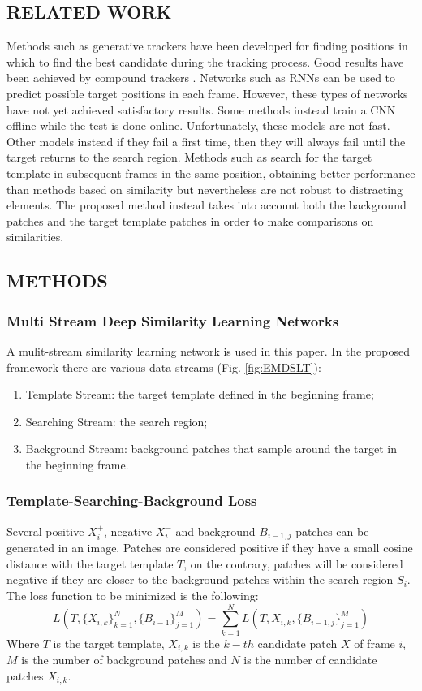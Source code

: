 \subsection{RELATED WORK}
Methods such as generative trackers have been developed for finding positions 
in which to find the best candidate during the tracking process. Good 
results have been achieved by compound trackers \cite{0893551105} \cite{0893551118}. Networks such as 
RNNs \cite{0893551121} can be used to predict possible target positions in each frame. 
However, these types of networks have not yet achieved satisfactory results. 
Some methods instead train a CNN offline while the test is done online. Unfortunately, 
these models are not fast. Other models instead if they fail a first 
time, then they will always fail until the target returns to the search region. 
Methods such as \cite{0893551129} \cite{0893551134} search for the target template in subsequent frames 
in the same position, obtaining better performance than methods based on 
similarity but nevertheless are not robust to distracting elements. The proposed 
method instead takes into account both the background patches and 
the target template patches in order to make comparisons on similarities.

\subsection{METHODS}
\subsubsection{Multi Stream Deep Similarity Learning Networks}
A mulit-stream similarity learning network is used in this paper. In the 
proposed framework there are various data streams (Fig. \ref{fig:EMDSLT}):
\begin{enumerate}
    \item Template Stream: the target template defined in the beginning frame;
    \item Searching Stream: the search region;
    \item Background Stream: background patches that sample around the target 
    in the beginning frame.
\end{enumerate}

\subsubsection{Template-Searching-Background Loss}
Several positive $X^+_i$, negative $X^-_i$ and background $B_{i-1,j}$ patches can be generated in an image. Patches are considered positive if they have a small cosine distance with the target template $T$, on the contrary, patches will be considered negative if they are closer to the background patches within the search region $S_i$. The loss function to be minimized is the following:
\begin{equation}
    L(T,\{X_{i,k}\}^N_{k=1}, \{B_{i-1}\}^M_{j=1}) = \sum_{k=1}^NL(T,X_{i,k}, \{B_{i-1,j}\}^M_{j=1})
\end{equation}
Where $T$ is the target template, $X_{i,k}$ is the $k-th$ candidate patch $X$ of frame $i$, $M$ is the number of background patches and $N$ is the number of candidate patches $X_{i,k}$.